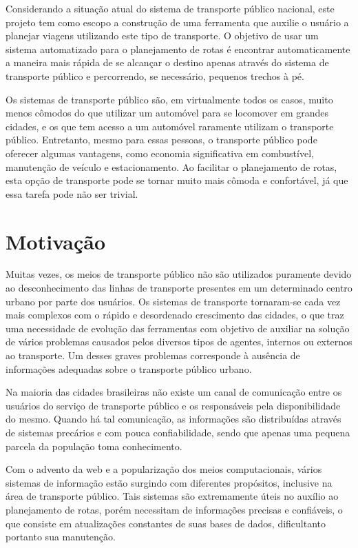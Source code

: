 Considerando a situação atual do sistema de transporte público nacional, este projeto tem como escopo a construção de uma ferramenta que auxilie o usuário a planejar viagens utilizando este tipo de transporte.
O objetivo de usar um sistema automatizado para o planejamento de rotas é encontrar automaticamente a maneira mais rápida de se alcançar o destino apenas através do sistema de transporte público e percorrendo, se necessário, pequenos trechos à pé.

Os sistemas de transporte público são, em virtualmente todos os casos, muito menos cômodos do que utilizar um automóvel para se locomover em grandes cidades, e os que tem acesso a um automóvel raramente utilizam o transporte público. Entretanto, mesmo para essas pessoas, o transporte público pode oferecer algumas vantagens, como economia significativa em combustível, manutenção de veículo e estacionamento. Ao facilitar o planejamento de rotas, esta opção de transporte pode se tornar muito mais cômoda e confortável, já que essa tarefa pode não ser trivial.

\section{Motivação}

Muitas vezes, os meios de transporte público não são utilizados puramente devido ao desconhecimento das linhas de transporte presentes em um determinado centro urbano por parte dos usuários.
Os sistemas de transporte tornaram-se cada vez mais complexos com o rápido e desordenado crescimento das cidades, o que traz uma necessidade de evolução das
ferramentas com objetivo de auxiliar na solução de vários problemas causados pelos diversos tipos de agentes, internos ou externos ao transporte. 
Um desses graves problemas corresponde à ausência de informações adequadas sobre o transporte público urbano.

Na maioria das cidades brasileiras não existe um canal de comunicação entre os usuários do serviço de transporte público e os responsáveis pela disponibilidade do mesmo. Quando há tal comunicação, as informações são distribuídas através de sistemas precários e com pouca confiabilidade, sendo que apenas uma pequena parcela da população toma conhecimento.

Com o advento da web e a popularização dos meios computacionais, vários sistemas de informação estão surgindo com diferentes propósitos, inclusive na área de transporte público. Tais sistemas são extremamente úteis no auxílio ao planejamento de rotas, porém necessitam de informações precisas e confiáveis, o que consiste em atualizações constantes de suas bases de dados, dificultanto portanto sua manutenção.

